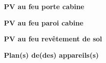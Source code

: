 \documentclass[a4paper, oneside, 10pt, french]{article}
\begin{document}
\newpage

\vspace*{10cm}

\begin{center}
\textbf{\Huge PV au feu porte cabine}
\end{center}

\newpage

\vspace*{10cm}

\begin{center}
\textbf{\Huge PV au feu paroi cabine}
\end{center}

\newpage

\vspace*{10cm}

\begin{center}
\textbf{\Huge PV au feu revêtement de sol}
\end{center}

\newpage

\vspace*{10cm}

\begin{center}
\textbf{\Huge Plan(s) de(des) appareils(s)}
\end{center}
\end{document}
